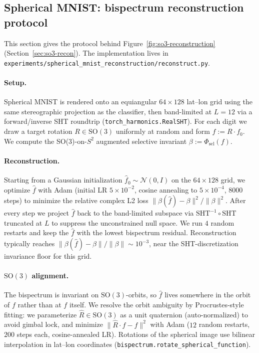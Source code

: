 \documentclass{article}
\theoremstyle{definition}
\theoremstyle{remark}
\newcommand{\SO}{\mathrm{SO}}
\theoremstyle{definition}
\begin{document}
\subsection{Spherical MNIST: bispectrum reconstruction protocol}
\label{app:so3-recon}

This section gives the protocol behind
Figure~\ref{fig:so3-reconstruction} (Section~\ref{sec:so3-recon}).
The implementation lives in
\texttt{experiments/spherical\_mnist\_reconstruction/reconstruct.py}.

\paragraph{Setup.}
Spherical MNIST is rendered onto an equiangular $64{\times}128$
lat--lon grid using the same stereographic projection as the
classifier, then band-limited at $L = 12$ via a forward/inverse SHT
roundtrip (\texttt{torch\_harmonics.RealSHT}). For each digit we
draw a target rotation $R\in\SO(3)$ uniformly at random and form
$f := R\cdot f_0$. We compute the SO(3)-on-$S^2$ augmented selective
invariant $\beta := \Phi_{\mathrm{sel}}(f)$.

\paragraph{Reconstruction.}
Starting from a Gaussian initialization $\hat f_0\sim\mathcal{N}(0, I)$
on the $64{\times}128$ grid, we optimize $\hat f$ with Adam
(initial LR $5\times 10^{-2}$, cosine annealing to $5\times 10^{-4}$,
$8000$ steps) to minimize the relative complex L2 loss
$\|\beta(\hat f) - \beta\|^2 / \|\beta\|^2$. After every step we
project $\hat f$ back to the band-limited subspace via $\mathrm{SHT}^{-1}\!\circ\mathrm{SHT}$ truncated at $L$ to suppress the
unconstrained null space. We run $4$ random restarts and keep the
$\hat f$ with the lowest bispectrum residual. Reconstruction
typically reaches $\|\beta(\hat f)-\beta\|/\|\beta\|\sim 10^{-3}$,
near the SHT-discretization invariance floor for this grid.

\paragraph{$\SO(3)$ alignment.}
The bispectrum is invariant on $\SO(3)$-orbits, so $\hat f$ lives
somewhere in the orbit of $f$ rather than at $f$ itself. We resolve
the orbit ambiguity by Procrustes-style fitting: we parameterize
$\hat R \in \SO(3)$ as a unit quaternion (auto-normalized) to avoid
gimbal lock, and minimize $\|\hat R\cdot\hat f - f\|^2$ with Adam
($12$ random restarts, $200$ steps each, cosine-annealed LR).
Rotations of the spherical image use bilinear interpolation in
lat--lon coordinates (\texttt{bispectrum.rotate\_spherical\_function}).
\end{document}
